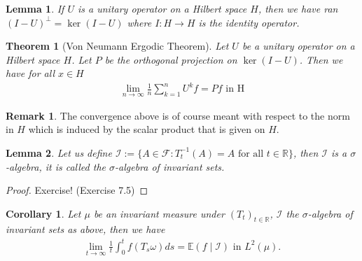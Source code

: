 \documentclass[11pt,a4paper, final]{article}
\newtheorem{lem}{Lemma}[section]
\newtheorem{thm}{Theorem}[section]
\newtheorem{cor}{Corollary}[section]
\theoremstyle{definition}
\newtheorem{rem}{Remark}[section]
\begin{document}
\begin{lem} If $U$ is a unitary operator on a Hilbert space $H$, then we have ran$(I-U)^\perp = \ker(I-U)$ where $I: H \to H$ is the identity operator. 
\end{lem}
\begin{thm}[Von Neumann Ergodic Theorem] Let $U$ be a unitary operator on a Hilbert space $H$. Let $P$ be the orthogonal projection on $\ker(I-U)$. Then we have for all $x \in H$ 
\begin{align*}
\lim_{n \to \infty} \frac{1}{n} \sum_{k=1}^n U^k f = Pf \text{ in H}
\end{align*}
\end{thm}
\begin{rem} The convergence above is of course meant with respect to the norm in $H$ which is induced by the scalar product that is given on $H$. 
\end{rem}
\begin{lem} Let us define $\mathcal{I}:= \lbrace A \in \mathcal{F} : T_t^{-1}(A) = A \text{ for all } t \in \mathbb{R} \rbrace$, then $\mathcal{I}$ is a $\sigma$-algebra, it is called the $\sigma$-algebra of invariant sets. 
\end{lem}
\begin{proof}
Exercise! (Exercise 7.5)
\end{proof}
\begin{cor} Let $\mu$ be an invariant measure under $(T_t)_{t \in \mathbb{R}}$, $\mathcal{I}$ the $\sigma$-algebra of invariant sets as above, then we have 
\begin{align*}
\lim_{t \to \infty} \frac{1}{t} \int_0^t f (T_s \omega) ds = \mathbb{E}(f \mid \mathcal{I}) \text{ in } L^2( \mu).
\end{align*}
\end{cor}
\newpage
\end{document}
